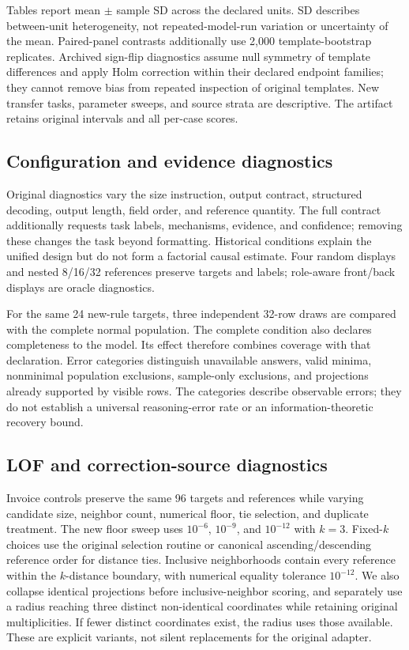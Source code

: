 \documentclass[conference]{IEEEtran}
\begin{document}
Tables report mean $\pm$ sample SD across the declared units. SD describes between-unit heterogeneity, not repeated-model-run variation or uncertainty of the mean. Paired-panel contrasts additionally use 2,000 template-bootstrap replicates. Archived sign-flip diagnostics assume null symmetry of template differences and apply Holm correction within their declared endpoint families; they cannot remove bias from repeated inspection of original templates. New transfer tasks, parameter sweeps, and source strata are descriptive. The artifact retains original intervals and all per-case scores.

\subsection{Configuration and evidence diagnostics}
Original diagnostics vary the size instruction, output contract, structured decoding, output length, field order, and reference quantity. The full contract additionally requests task labels, mechanisms, evidence, and confidence; removing these changes the task beyond formatting. Historical conditions explain the unified design but do not form a factorial causal estimate. Four random displays and nested 8/16/32 references preserve targets and labels; role-aware front/back displays are oracle diagnostics.

For the same 24 new-rule targets, three independent 32-row draws are compared with the complete normal population. The complete condition also declares completeness to the model. Its effect therefore combines coverage with that declaration. Error categories distinguish unavailable answers, valid minima, nonminimal population exclusions, sample-only exclusions, and projections already supported by visible rows. The categories describe observable errors; they do not establish a universal reasoning-error rate or an information-theoretic recovery bound.

\subsection{LOF and correction-source diagnostics}
Invoice controls preserve the same 96 targets and references while varying candidate size, neighbor count, numerical floor, tie selection, and duplicate treatment. The new floor sweep uses $10^{-6}$, $10^{-9}$, and $10^{-12}$ with $k=3$. Fixed-$k$ choices use the original selection routine or canonical ascending/descending reference order for distance ties. Inclusive neighborhoods contain every reference within the $k$-distance boundary, with numerical equality tolerance $10^{-12}$. We also collapse identical projections before inclusive-neighbor scoring, and separately use a radius reaching three distinct non-identical coordinates while retaining original multiplicities. If fewer distinct coordinates exist, the radius uses those available. These are explicit variants, not silent replacements for the original adapter.
\end{document}
